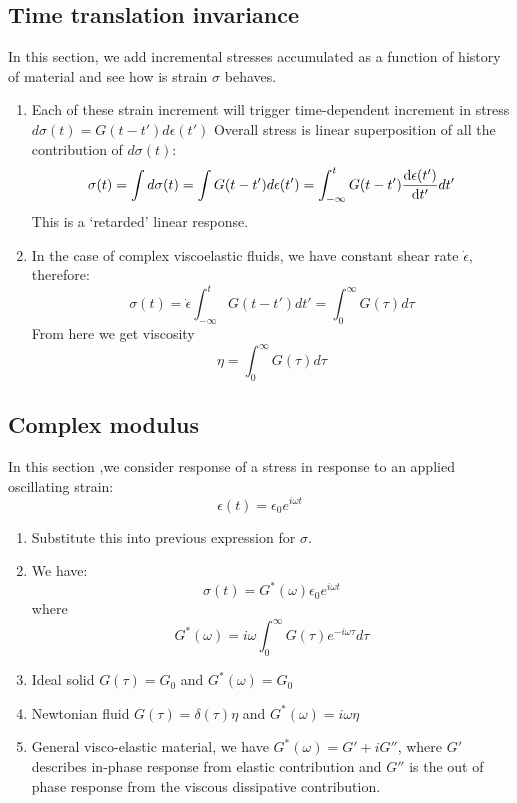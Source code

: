 \documentclass[12pt,a4paper]{article}
\begin{document}
\subsection {Time translation invariance}
    In this section, we add incremental stresses accumulated as a function of history of material and see how is strain $\sigma$ behaves.
    \begin{enumerate}
        \item Each of these strain increment will trigger time-dependent increment in stress $d\sigma(t) = G(t-t')d\epsilon(t')$
        Overall stress is linear superposition of all the contribution of $d\sigma(t)$:
        $$
            \sigma(t)=\int d\sigma(t) = \int G(t-t')d\epsilon(t') =\int^{t}_{-\infty } G(t-t')\dv{\epsilon(t')}{t'} dt' 
        $$
        This is a `retarded' linear response.
        \item In the case of complex viscoelastic fluids, we have constant shear rate $\dot{\epsilon}$, therefore:
        $$
            \sigma(t) = \dot{\epsilon}\int^{t}_{-\infty}G(t-t')dt'= \int^{\infty}_{0}G(\tau)d\tau
        $$
        From here we get viscosity
        $$
            \eta =\int^{\infty}_{0}G(\tau)d\tau
        $$
    \end{enumerate}
\subsection{Complex modulus}
    In this section ,we consider response of a stress in response to an applied oscillating strain:
    $$
        \epsilon(t)=\epsilon_0 e^{i\omega t}
    $$
    \begin{enumerate}
        \item Substitute this into previous expression for $\sigma$.
        \item We have:
        $$
            \sigma(t) = G^{*}(\omega)\epsilon_0 e^{i\omega t}
        $$
        where
        $$
            G^{*}(\omega) = i\omega \int^{\infty}_{0} G(\tau)e^{-i\omega \tau} d\tau
        $$
        \item Ideal solid $G(\tau)=G_0$ and $G^{*}(\omega) = G_0$
        \item Newtonian fluid $G(\tau)=\delta(\tau)\eta$ and $G^{*}(\omega) = i \omega \eta$
        \item General visco-elastic material, we have $G^{*}(\omega) = G'+i G''$, where $G'$ describes in-phase response from elastic contribution and $G''$  is the out of phase response from the viscous dissipative contribution.
    \end{enumerate}
\end{document}
